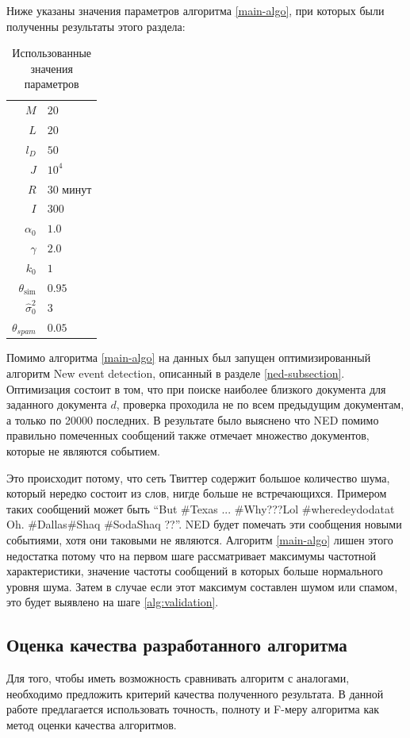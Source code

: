 \documentclass[12pt, a4paper]{article}
\DeclareMathOperator{\simu}{sim}
\begin{document}
	Ниже указаны значения параметров алгоритма \ref{main-algo}, при которых были полученны результаты этого раздела:
	
	\begin{table}[H]
	\centering
	\caption{Использованные значения параметров}
	\begin{tabular}{r | l}
	$M$ & $20$ \\
	$L$ & $20$ \\
	$l_D$ & $50$ \\
	$J$ & $10^4$ \\
	$R$ & $30$ минут \\
	$I$ & $300$ \\
	$\alpha_0$ & $1.0$ \\
	$\gamma$ & $2.0$ \\
	$k_0$ & $1$ \\
	$\theta_{\simu}$ & $0.95$ \\
	$\hat{\sigma}_0^2$ & $3$ \\
	$\theta_{spam}$ & $0.05$ \\
	\end{tabular}
	
	\label{params-table}
	\end{table}
	
	Помимо алгоритма \ref{main-algo} на данных был запущен оптимизированный алгоритм New event detection, описанный в разделе \ref{ned-subsection}. Оптимизация состоит в том, что при поиске наиболее близкого документа для заданного документа $d$, проверка проходила не по всем предыдущим документам, а только по 20000 последних. В результате было выяснено что NED помимо правильно помеченных сообщений также отмечает множество документов, которые не являются событием.
	
	Это происходит потому, что сеть Твиттер содержит большое количество шума, который нередко состоит из слов, нигде больше не встречающихся. Примером таких сообщений может быть ``But \#Texas ... \#Why???Lol \#wheredeydodatat Oh. \#Dallas\#Shaq \#SodaShaq ??''. NED будет помечать эти сообщения новыми событиями, хотя они таковыми не являются. Алгоритм  \ref{main-algo} лишен этого недостатка потому что на первом шаге рассматривает максимумы частотной характеристики, значение частоты сообщений в которых больше нормального уровня шума. Затем в случае если этот максимум составлен шумом или спамом, это будет выявлено на шаге \ref{alg:validation}.
	
	\subsection{Оценка качества разработанного алгоритма}
	Для того, чтобы иметь возможность сравнивать алгоритм с аналогами, необходимо предложить критерий качества полученного результата. В данной работе предлагается использовать точность, полноту и F-меру алгоритма как метод оценки качества алгоритмов.
	
\end{document}
